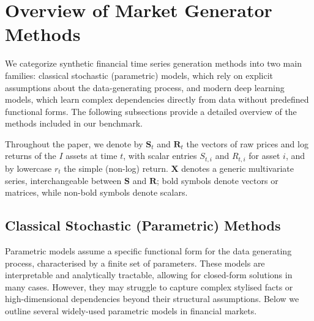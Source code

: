 \section{Overview of Market Generator Methods}
\label{sec:model-overview}
  We categorize synthetic financial time series generation methods into
  two main families: classical stochastic (parametric) models, which
  rely on explicit assumptions about the data-generating process, and
  modern deep learning models, which learn complex
  dependencies directly from data without predefined functional forms.
  The following subsections provide a detailed overview of the methods
  included in our benchmark.

    Throughout the paper, we denote by $\mathbf{S}_t$ and
    $\mathbf{R}_t$ the vectors of raw prices and log returns of the
    $I$ assets at time $t$, with scalar entries $S_{t,i}$ and $R_{t,i}$
    for asset $i$, and by lowercase $r_t$ the simple (non-log) return.
    $\mathbf{X}$ denotes a generic multivariate series, interchangeable
    between $\mathbf{S}$ and $\mathbf{R}$; bold symbols denote vectors
    or matrices, while non-bold symbols denote scalars.


  \subsection{Classical Stochastic (Parametric) Methods}
  \label{sub:parametric-methods}
    Parametric models assume a specific functional form for the 
    data generating process, characterised by a finite set of 
    parameters. These models are interpretable and analytically 
    tractable, allowing for closed-form solutions in many cases. 
    However, they may struggle to capture complex stylised facts 
    or high-dimensional dependencies beyond their structural 
    assumptions. Below we outline several widely-used parametric 
    models in financial markets.\\

        
